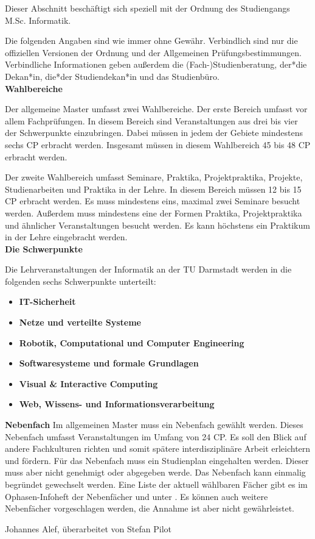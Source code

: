 {Dieser Abschnitt beschäftigt sich speziell mit der Ordnung des Studiengangs M.Sc. Informatik.
}{
Die folgenden Angaben sind wie immer ohne Gewähr. Verbindlich sind nur die offiziellen Versionen der Ordnung und der Allgemeinen Prüfungsbestimmungen. Verbindliche Informationen geben außerdem die (Fach-)Studienberatung, der*die Dekan*in, die*der Studiendekan*in und das Studienbüro.\\

\noindent\textbf{Wahlbereiche}

Der allgemeine Master umfasst zwei Wahlbereiche. Der erste Bereich umfasst vor allem Fachprüfungen. In diesem Bereich sind Veranstaltungen aus drei bis vier der Schwerpunkte einzubringen. Dabei müssen in jedem der Gebiete mindestens sechs CP erbracht werden. Insgesamt müssen in diesem Wahlbereich 45 bis 48 CP erbracht werden.

Der zweite Wahlbereich umfasst Seminare, Praktika, Projektpraktika, Projekte, Studienarbeiten und Praktika in der Lehre. In diesem Bereich müssen 12 bis 15 CP erbracht werden. Es muss mindestens eins, maximal zwei Seminare besucht werden. Außerdem muss mindestens eine der Formen Praktika, Projektpraktika und ähnlicher Veranstaltungen besucht werden. Es kann höchstens ein Praktikum in der Lehre eingebracht werden.\\

\columnbreak
\noindent\textbf{Die Schwerpunkte}

Die Lehrveranstaltungen der Informatik an der TU Darmstadt werden in die folgenden sechs Schwerpunkte unterteilt:
\begin{itemize}
\item \textbf{IT-Sicherheit}
\item \textbf{Netze und verteilte Systeme}
\item \textbf{Robotik, Computational und Computer Engineering}
\item \textbf{Softwaresysteme und formale Grundlagen}
\item \textbf{Visual \& Interactive Computing}
\item \textbf{Web, Wissens- und Informationsverarbeitung}
\end{itemize}

\noindent\textbf{Nebenfach}
Im allgemeinen Master muss ein Nebenfach gewählt werden. Dieses Nebenfach umfasst Veranstaltungen im Umfang von 24 CP. Es soll den Blick auf andere Fachkulturen richten und somit spätere interdisziplinäre Arbeit erleichtern und fördern. Für das Nebenfach muss ein Studienplan eingehalten werden. Dieser muss aber nicht genehmigt oder abgegeben werde. Das Nebenfach kann einmalig begründet gewechselt werden. Eine Liste der aktuell wählbaren Fächer gibt es im Ophasen-Infoheft der Nebenfächer und unter \footnotemark[2]. Es können auch weitere Nebenfächer vorgeschlagen werden, die Annahme ist aber nicht gewährleistet.\\
}
{Johannes Alef, überarbeitet von Stefan Pilot}


